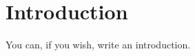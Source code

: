\documentclass[../main]{subfiles}
\begin{document}
\chapter*{Introduction}

You can, if you wish, write an introduction.
\end{document}
